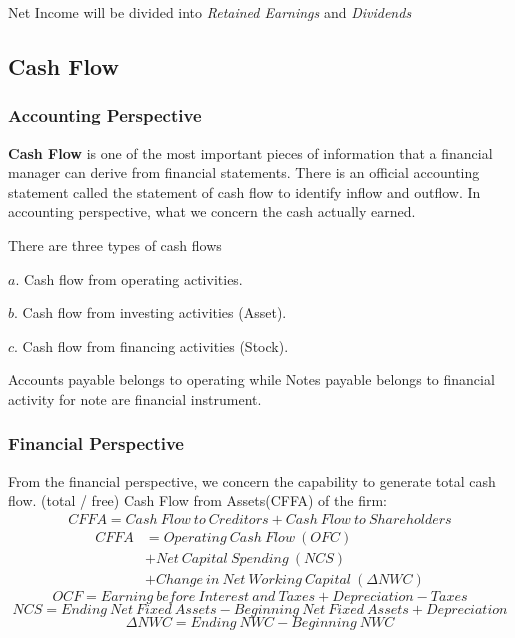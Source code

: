 \documentclass[10pt, a4paper]{article}
\begin{document}
        Net Income will be divided into \emph{Retained Earnings} and \emph{Dividends}
        
    \subsection{Cash Flow} 
        \subsubsection{Accounting Perspective}
        \textbf{Cash Flow} is one of the most important pieces of information that a financial manager can derive from financial statements. There is an official accounting statement called the statement of cash flow to identify inflow and outflow. In accounting perspective, what we concern the cash actually earned. 

        There are three types of cash flows 

        $a$. Cash flow from operating activities. 

        $b$. Cash flow from investing activities (Asset). 

        $c$. Cash flow from financing activities (Stock). 

        Accounts payable belongs to operating while Notes payable belongs to financial activity for note are financial instrument. 
        
        \subsubsection{Financial Perspective}
        From the financial perspective, we concern the capability to generate total cash flow. (total / free) Cash Flow from Assets(CFFA) of the firm:   
        \begin{align*}
            CFFA = Cash\ Flow\ to\ Creditors + Cash\ Flow\ to\ Shareholders
        \end{align*}
        \begin{align*}
            CFFA &= Operating\ Cash\ Flow\ (OFC)\\
                 &+ Net\ Capital\ Spending\ (NCS)\\
                 &+ Change\ in\ Net\ Working\ Capital\ (\Delta NWC) 
        \end{align*}
        $$OCF = Earning\ before\ Interest\ and\ Taxes + Depreciation - Taxes$$
        $$NCS = Ending\ Net\ Fixed\ Assets - Beginning\ Net\ Fixed\ Assets +  Depreciation$$
        $$\Delta NWC = Ending\ NWC - Beginning\ NWC$$
        
\end{document}
